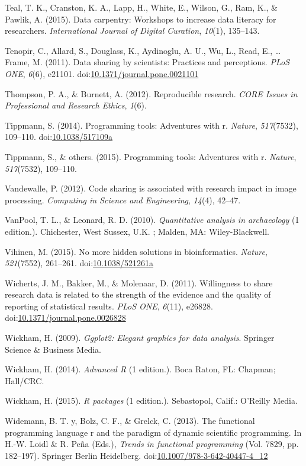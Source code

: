 \documentclass[american,man]{apa6}
\begin{document}
Teal, T. K., Cranston, K. A., Lapp, H., White, E., Wilson, G., Ram, K.,
\& Pawlik, A. (2015). Data carpentry: Workshops to increase data
literacy for researchers. \emph{International Journal of Digital
Curation}, \emph{10}(1), 135--143.

Tenopir, C., Allard, S., Douglass, K., Aydinoglu, A. U., Wu, L., Read,
E., \ldots{} Frame, M. (2011). Data sharing by scientists: Practices and
perceptions. \emph{PLoS ONE}, \emph{6}(6), e21101.
doi:\href{http://dx.doi.org/10.1371/journal.pone.0021101}{10.1371/journal.pone.0021101}

Thompson, P. A., \& Burnett, A. (2012). Reproducible research.
\emph{CORE Issues in Professional and Research Ethics}, \emph{1}(6).

Tippmann, S. (2014). Programming tools: Adventures with r.
\emph{Nature}, \emph{517}(7532), 109--110.
doi:\href{http://dx.doi.org/10.1038/517109a}{10.1038/517109a}

Tippmann, S., \& others. (2015). Programming tools: Adventures with r.
\emph{Nature}, \emph{517}(7532), 109--110.

Vandewalle, P. (2012). Code sharing is associated with research impact
in image processing. \emph{Computing in Science and Engineering},
\emph{14}(4), 42--47.

{VanPool}, T. L., \& Leonard, R. D. (2010). \emph{Quantitative analysis
in archaeology} (1 edition.). Chichester, West Sussex, U.K. ; Malden,
MA: Wiley-Blackwell.

Vihinen, M. (2015). No more hidden solutions in bioinformatics.
\emph{Nature}, \emph{521}(7552), 261--261.
doi:\href{http://dx.doi.org/10.1038/521261a}{10.1038/521261a}

Wicherts, J. M., Bakker, M., \& Molenaar, D. (2011). Willingness to
share research data is related to the strength of the evidence and the
quality of reporting of statistical results. \emph{PLoS ONE},
\emph{6}(11), e26828.
doi:\href{http://dx.doi.org/10.1371/journal.pone.0026828}{10.1371/journal.pone.0026828}

Wickham, H. (2009). \emph{Ggplot2: Elegant graphics for data analysis}.
Springer Science \& Business Media.

Wickham, H. (2014). \emph{Advanced R} (1 edition.). Boca Raton, FL:
Chapman; Hall/CRC.

Wickham, H. (2015). \emph{R packages} (1 edition.). Sebastopol, Calif.:
O'Reilly Media.

Widemann, B. T. y, Bolz, C. F., \& Grelck, C. (2013). The functional
programming language r and the paradigm of dynamic scientific
programming. In H.-W. Loidl \& R. Peña (Eds.), \emph{Trends in
functional programming} (Vol. 7829, pp. 182--197). Springer Berlin
Heidelberg.
doi:\href{http://dx.doi.org/10.1007/978-3-642-40447-4_12}{10.1007/978-3-642-40447-4\_12}
\end{document}
